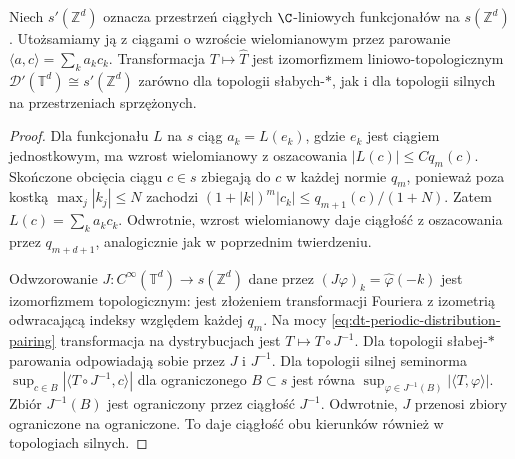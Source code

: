 \begin{wniosek}
\label{cor:dt-periodic-distribution-topological}
Niech $s'(\mathbb Z^d)$ oznacza przestrzeń
ciągłych $\C$-liniowych funkcjonałów na
$s(\mathbb Z^d)$. Utożsamiamy ją z ciągami
o wzroście wielomianowym przez parowanie
$\langle a,c\rangle=\sum_k a_kc_k$.
Transformacja $T\mapsto\widehat T$ jest
izomorfizmem liniowo-topologicznym
$\mathcal D'(\mathbb T^d)\cong s'(\mathbb Z^d)$
zarówno dla topologii słabych-$*$, jak i dla
topologii silnych na przestrzeniach sprzężonych.
\end{wniosek}
\begin{proof}
Dla funkcjonału $L$ na $s$ ciąg $a_k=L(e_k)$,
gdzie $e_k$ jest ciągiem jednostkowym, ma
wzrost wielomianowy z oszacowania $|L(c)|\le Cq_m(c)$.
Skończone obcięcia ciągu $c\in s$ zbiegają do $c$
w każdej normie $q_m$, ponieważ poza kostką
$\max_j|k_j|\le N$ zachodzi
$(1+|k|)^m|c_k|\le q_{m+1}(c)/(1+N)$.
Zatem $L(c)=\sum_k a_kc_k$.
Odwrotnie, wzrost wielomianowy daje ciągłość
z oszacowania przez $q_{m+d+1}$, analogicznie
jak w poprzednim twierdzeniu.

Odwzorowanie $J:C^\infty(\mathbb T^d)\to s(\mathbb Z^d)$
dane przez $(J\varphi)_k=\widehat\varphi(-k)$
jest izomorfizmem topologicznym:
jest złożeniem transformacji Fouriera
z izometrią odwracającą indeksy względem każdej $q_m$.
Na mocy \eqref{eq:dt-periodic-distribution-pairing}
transformacja na dystrybucjach jest
$T\mapsto T\circ J^{-1}$.
Dla topologii słabej-$*$ parowania odpowiadają
sobie przez $J$ i $J^{-1}$.
Dla topologii silnej seminorma
$\sup_{c\in B}|\langle T\circ J^{-1},c\rangle|$
dla ograniczonego $B\subset s$ jest równa
$\sup_{\varphi\in J^{-1}(B)}|\langle T,\varphi\rangle|$.
Zbiór $J^{-1}(B)$ jest ograniczony przez ciągłość
$J^{-1}$. Odwrotnie, $J$ przenosi zbiory
ograniczone na ograniczone. To daje ciągłość
obu kierunków również w topologiach silnych.
\end{proof}

